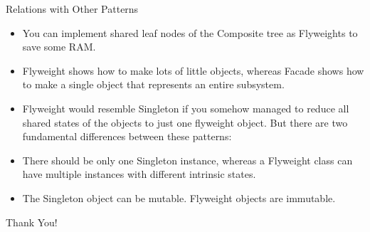 \documentclass[13pt]{beamer}
\begin{document}
\begin{frame}{Relations with Other Patterns}
	\begin{itemize}
		\setlength\itemsep{1em}
		\item You can implement shared leaf nodes of the Composite tree as Flyweights to save some RAM.
		\item Flyweight shows how to make lots of little objects, whereas Facade shows how to make a single object that represents an entire subsystem.
		\item Flyweight would resemble Singleton if you somehow managed to reduce all shared states of the objects to just one flyweight object. But there are two fundamental differences between these patterns:
		\item There should be only one Singleton instance, whereas a Flyweight class can have multiple instances with different intrinsic states.
		\item The Singleton object can be mutable. Flyweight objects are immutable.
	\end{itemize}
\end{frame}

\begin{frame}
\begin{center}
{\fontsize{40}{50}\selectfont Thank You!}
\end{center}
\end{frame}
\end{document}
